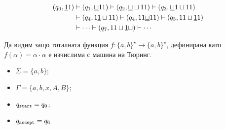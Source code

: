 \begin{example}
\begin{align*}
  (q_0, \underline{1}1) & \vdash (q_1, \underline{\sqcup}11) \vdash  (q_2, \underline{\sqcup} \sqcup 11) \vdash  (q_3, \underline{\sqcup} 1 \sqcup 11)\\
                        & \vdash (q_4, 1\underline{1}\sqcup 11) \vdash (q_4, 11 \underline{\sqcup} 11) \vdash (q_5, 11\sqcup \underline{1}1)\\
                        & \vdash \cdots \vdash (q_7, 11 \sqcup \underline{1}\sqcup) \vdash \cdots
\end{align*}

\end{example}


\begin{example}
  Да видим защо тоталната функция $f:\{a,b\}^\star \to \{a,b\}^\star$, дефинирана като
  $f(\alpha) = \alpha\cdot\alpha$ е изчислима с машина на Тюринг.
  
  \begin{itemize}
  \item
    $\Sigma = \{a,b\}$;
  \item 
    $\Gamma = \{a,b,x,A,B\}$;
  \item
    $q_{\texttt{start}} = q_0$;
  \item
    $q_{\texttt{accept}} = q_6$
  \end{itemize}
  \begin{framed}
  \begin{figure}[H]
    \begin{center}
\end{center}
\end{figure}
\end{framed}
\end{example}
